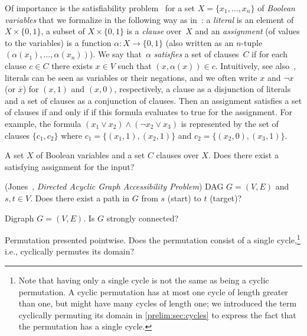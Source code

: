 Of importance is the satisfiability problem \SAT\ 
for a set $X = \{x_1, \ldots, x_n\}$
of \emph{Boolean variables} that we formalize 
in the following way as in~\cite[p.~314]{GorKou95}: 
a \emph{literal} is an element of $X \times \{0,1\}$,
a subset of $X \times \{0,1\}$ is a \emph{clause} over~$X$
and an \emph{assignment} (of values to the variables) 
is a function $\alpha \colon X \to \{0,1\}$ (also written as 
an $n$-tuple $(\alpha(x_1), \ldots, \alpha(x_n))$).
We say that~$\alpha$ \emph{satisfies} a set of clauses~$C$
if for each clause $c \in C$ there exists $x \in V$
such that $(x, \alpha(x)) \in c$. Intuitively, see also~\cite[Sec.~2.6]{garey1979computers,HopUll79},
literals can be seen as variables or their negations, 
and we often write $x$ and $\neg x$ (or $\overline{x}$) 
for $(x,1)$ and $(x,0)$, respectively,
a clause as a disjunction
of literals and a set of clauses as a conjunction of clauses.
Then an assignment satisfies a set of clauses if and only if 
if this formula evaluates to true for the assignment.
For example, the formula $( x_1 \lor x_2 ) \land ( \neg x_2 \lor x_3 )$
is represented by the set of clauses $\{ c_1, c_2\}$
where $c_1 = \{ (x_1, 1), (x_2, 1)\}$ and $c_2 = \{ (x_2, 0), (x_3, 1) \}$.

\IN{\SAT}
{A set $X$ of Boolean variables and a set $C$ clauses over $X$.}
{Does there exist a satisfying assignment for the input?}

\IN{\DAG} 
\decisionproblem
{\DAG (Jones~\cite{Jones75}, \emph{Directed Acyclic Graph Accessibility Problem})}
{DAG $G = (V, E)$ and $s,t \in V$.}
{Does there exist a path in $G$ from $s$ (start) to $t$ (target)?}

\IN{\SCC}
{Digraph $G = (V,E)$.}
{Is $G$ strongly connected?} 

\IN{\SCP}
{Permutation presented pointwise.}
{Does the permutation consist of a single cycle,\footnote{Note that having only a single cycle is not the same as being a cyclic permutation. A cyclic permutation has at most one
			cycle of length greater than one, but might have many cycles of length one; we introduced the term cyclically
			permuting its domain in \cref{prelim:sec:cycles} to express the fact that the permutation has a single cycle.}
		i.e., cyclically permutes its domain?}

